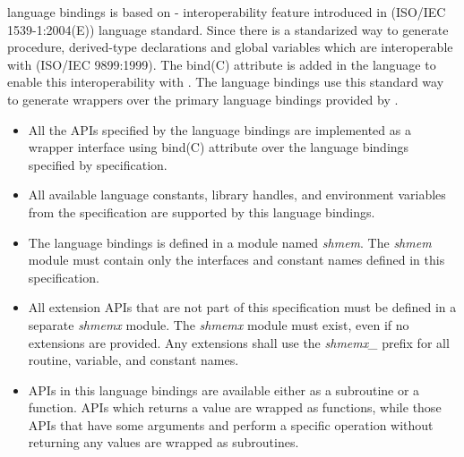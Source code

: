 \openshmem \Fortran[bind(C)] language bindings is based on \Fortran-\Cstd
interoperability feature introduced in \Fortran[2003](ISO/IEC 1539-1:2004(E))
language standard. Since \Fortran[2003] there is a standarized way to generate
procedure, derived-type declarations and global variables which are interoperable
with \Cstd(ISO/IEC 9899:1999). The bind(C) attribute is added in the \Fortran
language to enable this interoperability with \Cstd. The \openshmem
\Fortran[bind(C)] language bindings use this standard way to generate \Fortran
wrappers over the primary \Cstd language bindings provided by \openshmem.

\begin{itemize}
    \item All the \openshmem APIs specified by the \openshmem \Fortran[bind(C)]
    language bindings are implemented as a wrapper interface using \Fortran
    bind(C) attribute over the \Cstd language bindings specified by \openshmem
    specification.
    \item All available language constants, library handles, and environment
    variables from the \openshmem specification are supported by this language
    bindings.
    \item The \Fortran[bind(C)] language bindings is defined in a module named
    \textit{shmem}. The \textit{shmem} module must contain only the interfaces
    and constant names defined in this specification.
    \item All \openshmem extension APIs that are not part of this specification
    must be defined in a separate \textit{shmemx} module. The \textit{shmemx}
    module must exist, even if no extensions are provided. Any extensions shall
    use the \textit{shmemx\_} prefix for all routine, variable, and constant
    names.
    \item \openshmem APIs in this language bindings are available either as a
    subroutine or a function. \openshmem \Cstd APIs which returns a value are
    wrapped as functions, while those APIs that have some arguments and perform
    a specific operation without returning any values are wrapped as subroutines.
\end{itemize}
